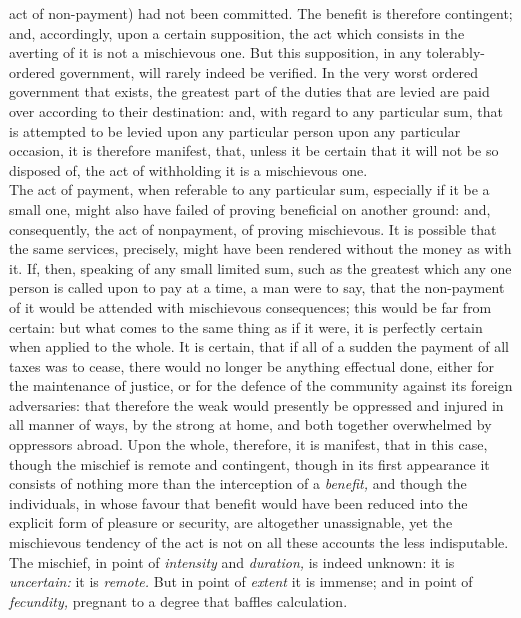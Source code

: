 \documentclass[12pt]{report}
\begin{document}
act of non-payment) had not been committed. The benefit is therefore
contingent; and, accordingly, upon a certain supposition, the act which
consists in the averting of it is not a mischievous one. But this
supposition, in any tolerably-ordered government, will rarely indeed be
verified. In the very worst ordered government that exists, the greatest
part of the duties that are levied are paid over according to their
destination: and, with regard to any particular sum, that is attempted
to be levied upon any particular person upon any particular occasion, it
is therefore manifest, that, unless it be certain that it will not be so
disposed of, the act of withholding it is a mischievous one.\\
The act of payment, when referable to any particular sum, especially if
it be a small one, might also have failed of proving beneficial on
another ground: and, consequently, the act of nonpayment, of proving
mischievous. It is possible that the same services, precisely, might
have been rendered without the money as with it. If, then, speaking of
any small limited sum, such as the greatest which any one person is
called upon to pay at a time, a man were to say, that the non-payment of
it would be attended with mischievous consequences; this would be far
from certain: but what comes to the same thing as if it were, it is
perfectly certain when applied to the whole. It is certain, that if all
of a sudden the payment of all taxes was to cease, there would no longer
be anything effectual done, either for the maintenance of justice, or
for the defence of the community against its foreign adversaries: that
therefore the weak would presently be oppressed and injured in all
manner of ways, by the strong at home, and both together overwhelmed by
oppressors abroad. Upon the whole, therefore, it is manifest, that in
this case, though the mischief is remote and contingent, though in its
first appearance it consists of nothing more than the interception of a
\emph{benefit,} and though the individuals, in whose favour that benefit
would have been reduced into the explicit form of pleasure or security,
are altogether unassignable, yet the mischievous tendency of the act is
not on all these accounts the less indisputable. The mischief, in point
of \emph{intensity} and \emph{duration,} is indeed unknown: it is
\emph{uncertain:} it is \emph{remote.} But in point of \emph{extent} it
is immense; and in point of \emph{fecundity,} pregnant to a degree that
baffles calculation.
\end{document}
